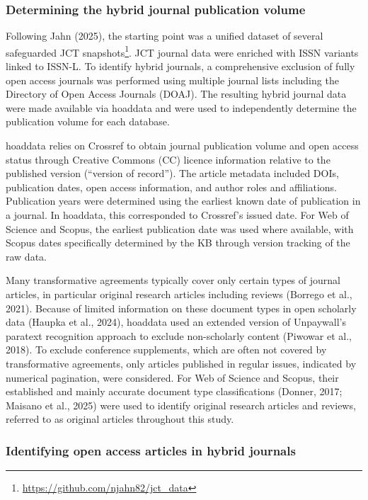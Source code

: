 \documentclass[a4paper,man,floatsintext,longtable,noextraspace,10pt]{apa6}
\begin{document}
\subsubsection{Determining the hybrid journal publication
volume}\label{determining-the-hybrid-journal-publication-volume}

Following Jahn (2025), the starting point was a unified dataset of
several safeguarded JCT snapshots\footnote{\url{https://github.com/njahn82/jct_data}}.
JCT journal data were enriched with ISSN variants linked to ISSN-L. To
identify hybrid journals, a comprehensive exclusion of fully open access
journals was performed using multiple journal lists including the
Directory of Open Access Journals (DOAJ). The resulting hybrid journal
data were made available via hoaddata and were used to independently
determine the publication volume for each database.

hoaddata relies on Crossref to obtain journal publication volume and
open access status through Creative Commons (CC) licence information
relative to the published version (``version of record''). The article
metadata included DOIs, publication dates, open access information, and
author roles and affiliations. Publication years were determined using
the earliest known date of publication in a journal. In hoaddata, this
corresponded to Crossref's issued date. For Web of Science and Scopus,
the earliest publication date was used where available, with Scopus
dates specifically determined by the KB through version tracking of the
raw data.

Many transformative agreements typically cover only certain types of
journal articles, in particular original research articles including
reviews (Borrego et al., 2021). Because of limited information on these
document types in open scholarly data (Haupka et al., 2024), hoaddata
used an extended version of Unpaywall's paratext recognition approach to
exclude non-scholarly content (Piwowar et al., 2018). To exclude
conference supplements, which are often not covered by transformative
agreements, only articles published in regular issues, indicated by
numerical pagination, were considered. For Web of Science and Scopus,
their established and mainly accurate document type classifications
(Donner, 2017; Maisano et al., 2025) were used to identify original
research articles and reviews, referred to as original articles
throughout this study.

\subsubsection{Identifying open access articles in hybrid
journals}\label{identifying-open-access-articles-in-hybrid-journals}
\end{document}
